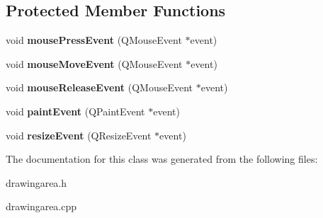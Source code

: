 \subsection*{Protected Member Functions}
\begin{DoxyCompactItemize}
\item 
\hypertarget{class_drawing_area_a6a53721276e4a794843898f9c06b8ed7}{
void {\bfseries mousePressEvent} (QMouseEvent $\ast$event)}
\label{class_drawing_area_a6a53721276e4a794843898f9c06b8ed7}

\item 
\hypertarget{class_drawing_area_aeeae8f7bca672190573d21c7d2a44867}{
void {\bfseries mouseMoveEvent} (QMouseEvent $\ast$event)}
\label{class_drawing_area_aeeae8f7bca672190573d21c7d2a44867}

\item 
\hypertarget{class_drawing_area_ae4f98caefa2707f4ba7e212e88adb123}{
void {\bfseries mouseReleaseEvent} (QMouseEvent $\ast$event)}
\label{class_drawing_area_ae4f98caefa2707f4ba7e212e88adb123}

\item 
\hypertarget{class_drawing_area_ae9f9f50f6a550655f8bc525176cee32c}{
void {\bfseries paintEvent} (QPaintEvent $\ast$event)}
\label{class_drawing_area_ae9f9f50f6a550655f8bc525176cee32c}

\item 
\hypertarget{class_drawing_area_a383bbdb059d7a87249dfb20b60c65752}{
void {\bfseries resizeEvent} (QResizeEvent $\ast$event)}
\label{class_drawing_area_a383bbdb059d7a87249dfb20b60c65752}

\end{DoxyCompactItemize}


The documentation for this class was generated from the following files:\begin{DoxyCompactItemize}
\item 
drawingarea.h\item 
drawingarea.cpp\end{DoxyCompactItemize}

